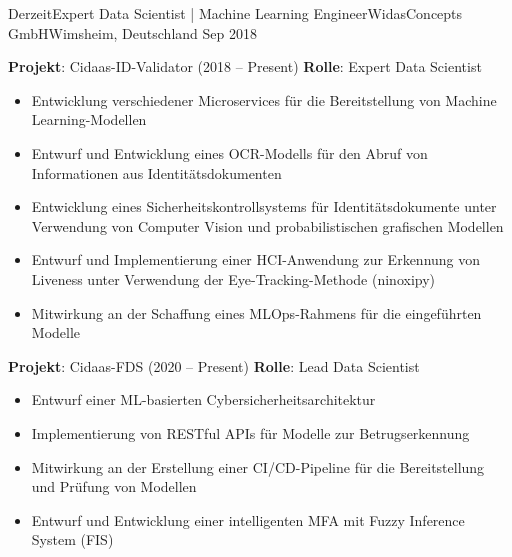 %
%
%
\begin{experiences}
  \experience
  {Derzeit}{Expert Data Scientist | Machine Learning Engineer}{WidasConcepts GmbH}{Wimsheim, Deutschland}
  {Sep 2018} {
    \vspace{0.1cm}
    \textbf{Projekt}: Cidaas-ID-Validator (2018 -- Present) \newline
    \textbf{Rolle}: Expert Data Scientist
    \begin{itemize}
      \item Entwicklung verschiedener Microservices für die Bereitstellung von Machine Learning-Modellen
      \item Entwurf und Entwicklung eines OCR-Modells für den Abruf von Informationen aus Identitätsdokumenten
      \item Entwicklung eines Sicherheitskontrollsystems für Identitätsdokumente unter Verwendung von Computer Vision und probabilistischen grafischen Modellen
      \item Entwurf und Implementierung einer HCI-Anwendung zur Erkennung von Liveness unter Verwendung der Eye-Tracking-Methode (ninoxipy)
      \item Mitwirkung an der Schaffung eines MLOps-Rahmens für die eingeführten Modelle
    \end{itemize}
    \vspace{0.1cm}
    \textbf{Projekt}: Cidaas-FDS (2020 -- Present)\newline
    \textbf{Rolle}: Lead Data Scientist
    \begin{itemize}
      \item Entwurf einer ML-basierten Cybersicherheitsarchitektur
      \item Implementierung von RESTful APIs für Modelle zur Betrugserkennung
      \item Mitwirkung an der Erstellung einer CI/CD-Pipeline für die Bereitstellung und Prüfung von Modellen
      \item Entwurf und Entwicklung einer intelligenten MFA mit Fuzzy Inference System (FIS)
    \end{itemize}
    \vspace{0.1cm}

}
\end{experiences}
